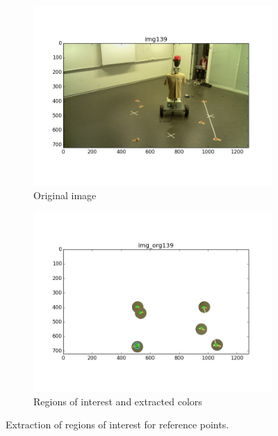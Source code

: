\begin{figure}[htb]
	\centering
	\begin{subfigure}[b]{0.49\linewidth}
        \centering
		\includegraphics[width=\linewidth]{files/_img139_cvt.png}
		\caption{Original image}
		\label{fig:img}
	\end{subfigure}
	\begin{subfigure}[b]{0.49\linewidth}
        \centering
		\includegraphics[width=\linewidth]{files/_img_org139.png}
		\caption{Regions of interest and extracted colors}
		\label{fig:img_org}
	\end{subfigure}
    \caption{Extraction of regions of interest for reference points.} 
\end{figure}

